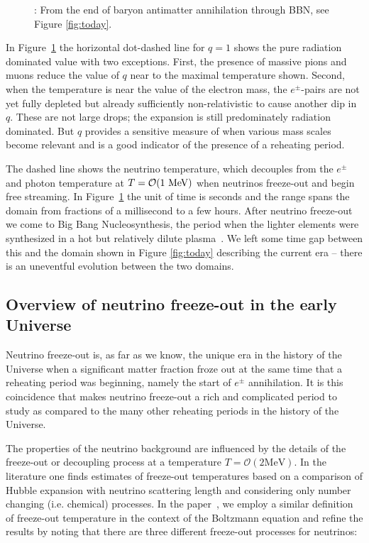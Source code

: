 \begin{figure}
\begin{minipage}{\linewidth}
\caption{: From the end of baryon antimatter annihilation through BBN, see Figure \ref{fig:today}. %
\label{fig:BBN} }
\end{minipage}
\end{figure}

 In Figure~\ref{fig:BBN} the horizontal dot-dashed line for $q=1$ shows the pure radiation dominated value with two exceptions. First, the presence of massive pions and muons reduce the value of $q$ near to the maximal temperature shown. Second, when the temperature is near the value of the electron mass, the $e^\pm$-pairs are not yet fully depleted but already sufficiently non-relativistic to cause another dip in $q$. These are not large drops; the expansion is still predominately radiation dominated. But $q$ provides a sensitive measure of when various mass scales become relevant and is a good indicator of the presence of a reheating period.

 The dashed line shows the neutrino temperature, which decouples from the $e^\pm$ and photon temperature at $T={\cal O}(1\MeV)$ when neutrinos freeze-out and begin free streaming. In Figure~\ref{fig:BBN} the unit of time is seconds and the range spans the domain from fractions of a millisecond to a few hours. After neutrino freeze-out we come to Big Bang Nucleosynthesis, the period when the lighter elements were synthesized in a hot but relatively dilute plasma~\cite{Iocco:2008va}. We left some time gap between this and the domain shown in Figure \ref{fig:today} describing the current era -- there is an uneventful evolution between the two domains.  
 



\subsection{Overview of neutrino freeze-out in the early Universe}
 Neutrino freeze-out is, as far as we know, the unique era in the history of the Universe when a significant matter fraction froze out at the same time that a reheating period was beginning, namely the start of $e^\pm$ annihilation. It is this coincidence that makes neutrino freeze-out a rich and complicated period to study as compared to the many other reheating periods in the history of the Universe. 

The properties of the neutrino background are influenced by the details of the freeze-out or decoupling process at a temperature $T=\mathcal{O}(2\mathrm{MeV})$. In the literature one finds estimates of freeze-out temperatures based on a comparison of Hubble expansion with neutrino scattering length and considering only number changing (i.e. chemical) processes. In the paper~\cite{Birrell:2014uka}, we employ a similar definition of freeze-out temperature in the context of the Boltzmann equation and refine the results by noting that there are three different freeze-out processes for neutrinos:


